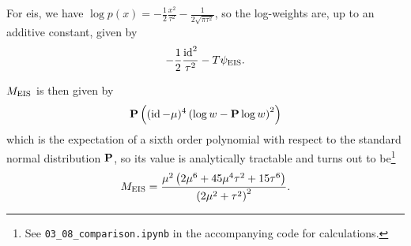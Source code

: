 For \acrshort{eis}, we have $\log p(x) = -\frac{1}{2} \frac{x^{2}}{\tau^{2}} - \frac{1}{2\sqrt{\pi\tau^{2}}}$, so the log-weights are, up to an additive constant, given by
$$
    - \frac{1}{2} \frac{\id^{2}}{\tau^{2}} - T \psi_{\eis}.
$$

$M_{\eis}$ is then given by 
$$
    \P \left( (\id - \mu)^{4} \left( \log w - \P \log w \right)^{2}  \right)
$$
which is the expectation of a sixth order polynomial with respect to the standard normal distribution $\P$, so its value is analytically tractable and turns out to be\footnote{See \texttt{03\_08\_comparison.ipynb} in the accompanying code for calculations.}
$$ M_{\eis} = \frac{\mu^{2} \left(2 \mu^{6} + 45 \mu^{4} \tau^{2} + 15 \tau^{6}\right)}{\left(2 \mu^{2} + \tau^{2}\right)^{2}}.
$$


